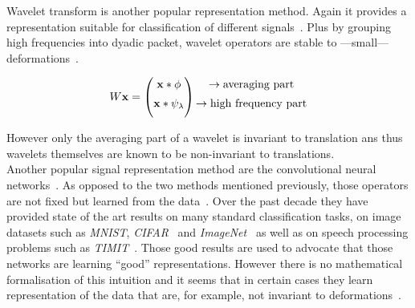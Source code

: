\documentclass[a4paper,11pt]{report}
\begin{document}
			Wavelet transform is another popular representation method. Again it provides a representation suitable for classification of different signals~\citep{de2000using}. Plus by grouping high frequencies into dyadic packet, wavelet operators are stable to ---small--- deformations~\citep{bruna2013invariant}.  %
			
			\begin{equation}
				\begin{matrix}
					W{\bf x} =
					\begin{pmatrix}
						{\bf x} \ast \phi \\[0.5em]
						{\bf x} \ast \psi_{\lambda} \\[0.5em]
					\end{pmatrix}
					\begin{aligned}
						\begin{matrix}
							\rightarrow \text{averaging part}				\\[0.5em]
							\rightarrow \text{high frequency part}	\\[0.5em]
						\end{matrix}
					\end{aligned}
				\end{matrix}
			\end{equation}
		
			However only the averaging part of a wavelet is invariant to translation ans thus wavelets themselves are known to be non-invariant to translations.\\
			
			Another popular signal representation method are the convolutional neural networks~\citep{lecun1995convolutional}. As opposed to the two methods mentioned previously, those operators are not fixed but learned from the data~\citep{simard2003best}. Over the past decade they have provided state of the art results on many standard classification tasks, on image datasets such as \textit{MNIST}, \textit{CIFAR}~\citep{hinton2012improving} and \textit{ImageNet}~\citep{krizhevsky2012imagenet} as well as on speech processing problems such as \textit{TIMIT}~\citep{abdel2012applying}. Those good results are used to advocate that those networks are learning ``good'' representations. However there is no mathematical formalisation of this intuition and it seems that in certain cases they learn representation of the data that are, for example, not invariant to deformations~\citep{szegedy2013intriguing}.\\
			
\end{document}
